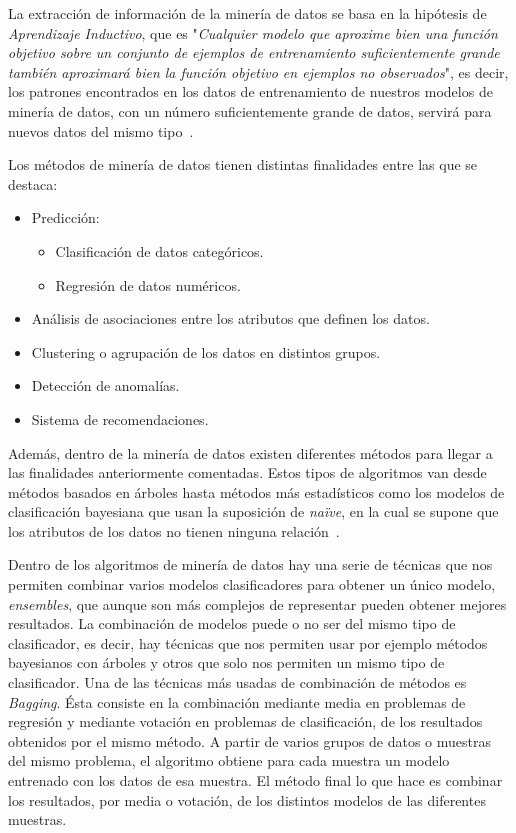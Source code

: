 La extracción de información de la minería de datos se basa en la hipótesis de \textit{Aprendizaje Inductivo}, que es "\textit{Cualquier modelo que aproxime bien una función objetivo sobre un conjunto de ejemplos de entrenamiento suficientemente grande también aproximará bien la función objetivo en ejemplos no observados}", es decir, los patrones encontrados en los datos de entrenamiento de nuestros modelos de minería de datos, con un número suficientemente grande de datos, servirá para nuevos datos del mismo tipo~\cite{mdintro}.

Los métodos de minería de datos tienen distintas finalidades entre las que se destaca:
\begin{itemize}
	\item Predicción:
	\begin{itemize}
		\item Clasificación de datos categóricos.
		\item Regresión de datos numéricos.
	\end{itemize}
	\item Análisis de asociaciones entre los atributos que definen los datos.
	\item Clustering o agrupación de los datos en distintos grupos.
	\item Detección de anomalías.
	\item Sistema de recomendaciones.
\end{itemize}

Además, dentro de la minería de datos existen diferentes métodos para llegar a las finalidades anteriormente comentadas. Estos tipos de algoritmos van desde métodos basados en árboles hasta métodos más estadísticos como los modelos de clasificación bayesiana que usan la suposición de \textit{naïve}, en la cual se supone que los atributos de los datos no tienen ninguna relación~\cite{mdrf}.

Dentro de los algoritmos de minería de datos hay una serie de técnicas que nos permiten combinar varios modelos clasificadores para obtener un único modelo, \textit{ensembles}, que aunque son más complejos de representar pueden obtener mejores resultados. La combinación de modelos puede o no ser del mismo tipo de clasificador, es decir, hay técnicas que nos permiten usar por ejemplo métodos bayesianos con árboles y otros que solo nos permiten un mismo tipo de clasificador. Una de las técnicas más usadas de combinación de métodos es \textit{Bagging}. Ésta consiste en la combinación mediante media en problemas de regresión y mediante votación en problemas de clasificación, de los resultados obtenidos por el mismo método. A partir de varios grupos de datos o muestras del mismo problema, el algoritmo obtiene para cada muestra un modelo entrenado con los datos de esa muestra. El método final lo que hace es combinar los resultados, por media o votación, de los distintos modelos de las diferentes muestras.

